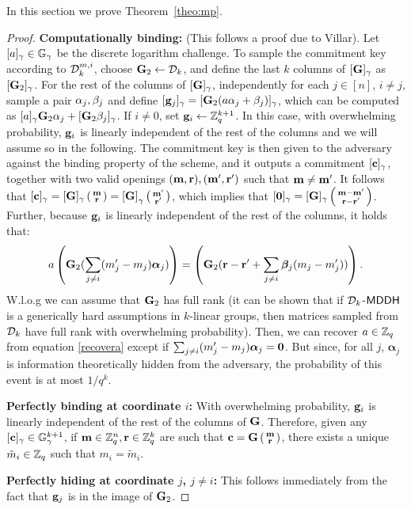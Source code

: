 In this section we prove Theorem~\ref{theo:mp}. 

\begin{proof}
{\bf Computationally binding:} (This follows a proof due to Villar). Let $[a]_\gamma\in\mathbb{G}_{\gamma}$ be the discrete logarithm challenge. To sample the commitment key according to $\mathcal{D}_k^{m,i}$, choose $\mathbf{{G}}_{2} \gets \mathcal{D}_k$, and define the last $k$ columns of $[\mathbf{{G}}]_\gamma$ as $[\mathbf{{G}}_{2}]_{\gamma}$. For the rest of the columns of $[\mathbf{{G}}]_\gamma$, independently  for each $j \in [n]$, $i \neq j$, sample a pair $\mathbf{\alpha}_j,\mathbf{\beta}_j$ and define $[\mathbf{g}_{j}]_{\gamma}=[\mathbf{{G}}_{2} (a \mathbf{\alpha}_j+\beta_j)]_\gamma$,
which can be computed as $[a]_\gamma \mathbf{{G}}_{2}\mathbf{\alpha}_j+[ \mathbf{{G}}_{2} \beta_j]_\gamma$. If $i \neq 0$, set $\mathbf{g}_{i} \gets \mathbb{Z}_q^{k+1}$. In this case, with overwhelming probability,  $\mathbf{g}_{i}$ is linearly independent of the rest of the columns and we will assume so in the following. 
The commitment key is then given to the adversary against the binding property of the scheme, and it outputs a commitment $[\mathbf{c}]_{\gamma}$, together with two valid openings 
$(\mathbf{m},\mathbf{r}), (\mathbf{m}',\mathbf{r}')$ such that $\mathbf{m}\neq \mathbf{m}'$. It follows that $[\mathbf{c}]_{\gamma}=[\mathbf{{G}}]_{\gamma} \left(\begin{smallmatrix}\mathbf{m} \\ \mathbf{r}\end{smallmatrix}\right) = \left[\mathbf{{G}}\right]_{\gamma}\left(\begin{smallmatrix}\mathbf{m}' \\ \mathbf{r}'\end{smallmatrix}\right)$, which implies that $[\mathbf{0}]_{\gamma}=[\mathbf{{G}}]_{\gamma} \left(\begin{smallmatrix}\mathbf{m}-\mathbf{m}' \\ \mathbf{r}-\mathbf{r}'\end{smallmatrix}\right)$. Further, because $\mathbf{g}_i$ is linearly independent of the rest of the columns, it holds that:
\begin{equation}\label{recovera}
a \left(\mathbf{{G}}_{2} (\sum_{j \neq i} (m'_j-m_j)  \boldsymbol{\alpha}_j) \right) = \left(  \mathbf{{G}}_{2}  (\mathbf{r}-\mathbf{r}' + \sum_{j \neq i} \boldsymbol{\beta}_j  (m_j-m_j'))\right).
\end{equation}
W.l.o.g we can assume that $\mathbf{{G}}_{2}$ has full rank (it can be shown that if $\mathcal{D}_k$-$\mathsf{MDDH}$ is a generically hard assumptions in $k$-linear groups, then matrices sampled from $\mathcal{D}_k$ have full rank with overwhelming probability).  Then, we can recover $a \in \mathbb{Z}_q$ from equation \ref{recovera} except if $\sum_{j \neq i} (m'_j-m_j)  \boldsymbol{\alpha}_j = \mathbf{0}$. But since, for all $j$, $\boldsymbol{\alpha}_j$ is information theoretically hidden from the adversary, the probability of this event is at most 
$1/q^k$. 

{\bf Perfectly binding at coordinate $i$:} With overwhelming probability, $\mathbf{g}_i$ is linearly independent of the rest of the columns of $\mathbf{{G}}$. Therefore, given any $[\mathbf{c}]_{\gamma} \in \mathbb{G}_{\gamma}^{k+1}$, if $\mathbf{m}\in\mathbb{Z}_q^n, \mathbf{r} \in\mathbb{Z}_q^k$ are such that $\mathbf{c}=\mathbf{{G}}\left(\begin{smallmatrix}\mathbf{m}\\ \mathbf{r}\end{smallmatrix}\right)$, there exists a unique $\tilde{m}_i \in \mathbb{Z}_q$ such 
that $m_i=\tilde{m}_i$. 

{\bf Perfectly hiding at coordinate $j$, $j \neq i$:} This follows immediately from the fact that $\mathbf{g}_j$ is in the image 
of $\mathbf{{G}}_{2}$. 
\end{proof}


